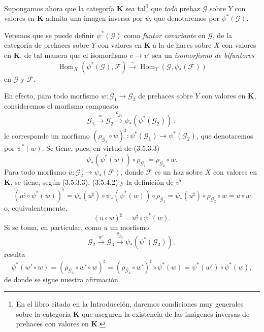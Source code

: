 
\begin{env}[3.5.4]
\label{0.3.5.4-fr}
Supongamos ahora que la categoría $\boldsymbol{K}$ sea tal\footnote{En
el libro citado en la Introducción, daremos condiciones muy
generales sobre la categoría $\boldsymbol{K}$ que aseguren la existencia de las imágenes
inversas de prehaces con valores en $\boldsymbol{K}$.} que \emph{todo}
prehaz $\mathcal{G}$ sobre $Y$ con valores en $\boldsymbol{K}$ admita una
imagen inversa por $\psi$, que denotaremos por $\psi^*(\mathcal{G})$.

Veremos que se puede definir $\psi^*(\mathcal{G})$ como \emph{funtor
covariante} en $\mathcal{G}$, de la categoría de prehaces sobre $Y$ con
valores en $\boldsymbol{K}$ a la de haces sobre $X$ con valores en
$\boldsymbol{K}$, de tal manera que el isomorfismo $v\to v^\flat$ sea un
\emph{isomorfismo de bifuntores}
\begin{equation*}
  \operatorname{Hom}_X(\psi^*(\mathcal{G}),\mathcal{F})
  \xrightarrow{\sim}
  \operatorname{Hom}_Y(\mathcal{G},\psi_*(\mathcal{F}))
\tag{3.5.4.1}\label{0.3.5.4.1-fr}
\end{equation*}
en $\mathcal{G}$ y $\mathcal{F}$.

En efecto, para todo morfismo
$w:\mathcal{G}_1\to\mathcal{G}_2$ de prehaces sobre $Y$ con valores en
$\boldsymbol{K}$, consideremos el morfismo compuesto
\[
  \mathcal{G}_1\xrightarrow{w}\mathcal{G}_2
  \xrightarrow{\rho_{\mathcal{G}_2}}
  \psi_*(\psi^*(\mathcal{G}_2))~;
\]
le corresponde un morfismo
$(\rho_{\mathcal{G}_2}\circ w)^\sharp:
\psi^*(\mathcal{G}_1)\to\psi^*(\mathcal{G}_2)$, que denotaremos por
$\psi^*(w)$. Se tiene, pues, en virtud de (3.5.3.3)
\begin{equation*}
  \psi_*(\psi^*(w))\circ\rho_{\mathcal{G}_1}
  =\rho_{\mathcal{G}_2}\circ w.
\tag{3.5.4.2}\label{0.3.5.4.2-fr}
\end{equation*}
Para todo morfismo $u:\mathcal{G}_2\to\psi_*(\mathcal{F})$, donde
$\mathcal{F}$ es un haz sobre $X$ con valores en $\boldsymbol{K}$, se tiene,
según (3.5.3.3), (3.5.4.2) y la definición de $v^\flat$
\[
  (u^\sharp\circ\psi^*(w))^\flat
  =\psi_*(u^\sharp)\circ\psi_*(\psi^*(w))\circ\rho_{\mathcal{G}_1}
  =\psi_*(u^\sharp)\circ\rho_{\mathcal{G}_2}\circ w
  =u\circ w
\]
o, equivalentemente,
\begin{equation*}
  (u\circ w)^\sharp=u^\sharp\circ\psi^*(w).
\tag{3.5.4.3}\label{0.3.5.4.3-fr}
\end{equation*}
Si se toma, en particular, como $u$ un morfismo
\[
  \mathcal{G}_2\xrightarrow{w'}\mathcal{G}_3
  \xrightarrow{\rho_{\mathcal{G}_3}}
  \psi_*(\psi^*(\mathcal{G}_3)),
\]
resulta
\[
  \psi^*(w'\circ w)
  =(\rho_{\mathcal{G}_3}\circ w'\circ w)^\sharp
  =(\rho_{\mathcal{G}_3}\circ w')^\sharp\circ\psi^*(w)
  =\psi^*(w')\circ\psi^*(w),
\]
de donde se sigue nuestra afirmación.


\end{env}
